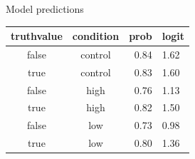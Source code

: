 \documentclass[aspectratio=169]{beamer}
\begin{document}
\begin{frame}{Model predictions}
\centering
\begin{tabular}{ccrl}
  \hline
 truthvalue & condition & prob & logit \\ 
  \hline
 false & control & 0.84 & 1.62  \\ 
 true  & control & 0.83 & 1.60  \\ 
 false & high    & 0.76 & 1.13  \\ 
 true  & high    & 0.82 & 1.50  \\ 
 false & low     & 0.73 & 0.98  \\ 
 true  & low     & 0.80 & 1.36  \\ 
 \hline
\end{tabular}
\end{frame}
\end{document}
